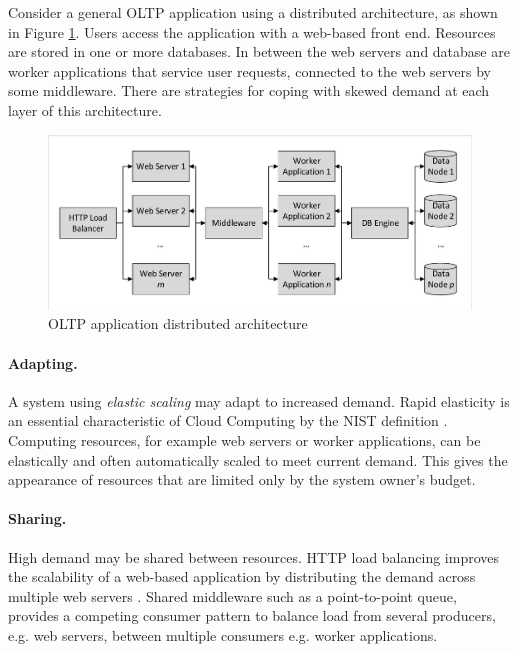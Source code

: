 \documentclass[runningheads]{llncs}
\begin{document}
Consider a general OLTP application using a distributed architecture, as shown in Figure \ref{figure:oltpapplication}.  Users access the application with a web-based front end.  Resources are stored in one or more databases.  In between the web servers and database are worker applications that service user requests, connected to the web servers by some middleware.  There are strategies for coping with skewed demand at each layer of this architecture.

\begin{figure}
	\caption{OLTP application distributed architecture}
	\label{figure:oltpapplication}
	\centering
	\includegraphics[trim = 5 5 5 5, clip, width=\textwidth]{img/application}
\end{figure}

\paragraph{Adapting.} A system using {\itshape elastic scaling} may adapt to increased demand. Rapid elasticity is an essential characteristic of Cloud Computing by the NIST definition \cite{RN56}.  Computing resources, for example web servers or worker applications, can be elastically and often automatically scaled to meet current demand.  This gives the appearance of resources that are limited only by the system owner's budget.

\paragraph{Sharing.} High demand may be shared between resources.  HTTP load balancing improves the scalability of a web-based application by distributing the demand across multiple web servers \cite{RN73}.  Shared middleware such as a point-to-point queue, provides a competing consumer pattern to balance load from several producers, e.g. web servers, between multiple consumers e.g. worker applications.
\end{document}
